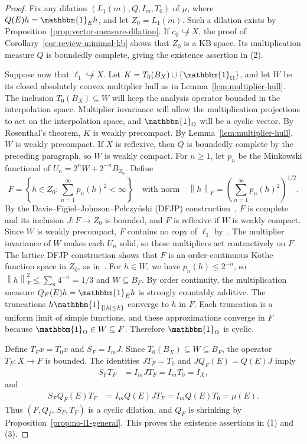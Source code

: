\documentclass[11pt,leqno]{amsart}
\theoremstyle{compact}
\numberwithin{equation}{section}
\theoremstyle{compactremark}
\theoremstyle{compact}
\newcommand{\1}{\mathbbm{1}}
\newcommand{\norm}[1]{\left\|#1\right\|}
\newcommand{\abs}[1]{\left|#1\right|}
\begin{document}
\begin{proof}
{Fix any dilation $(L_1(m),Q,I_m,T_0)$ of $\mu$, where $Q(E)h=\1_Eh$, and let $Z_0=L_1(m)$. Such a dilation exists by Proposition~\ref{prop:vector-measure-dilation}. If $c_0\not\hookrightarrow X$, the proof of Corollary~\ref{cor:review-minimal-kb} shows that $Z_0$ is a KB-space. Its multiplication measure $Q$ is boundedly complete, giving the existence assertion in (2).}

Suppose now that $\ell_1\not\hookrightarrow X$. Let $K=T_0(B_X)\cup\{\1_\Omega\}$, and let $W$ be its closed absolutely convex multiplier hull as in Lemma~\ref{lem:multiplier-hull}. The inclusion $T_0(B_X)\subseteq W$ will keep the analysis operator bounded in the interpolation space. Multiplier invariance will allow the multiplication projections to act on the interpolation space, and $\1_\Omega$ will be a cyclic vector. By Rosenthal's theorem, $K$ is weakly precompact. By Lemma~\ref{lem:multiplier-hull}, $W$ is weakly precompact. If $X$ is reflexive, then $Q$ is boundedly complete by the preceding paragraph, so $W$ is weakly compact. For $n\geq1$, let $p_n$ be the Minkowski functional of $U_n=2^nW+2^{-n}B_{Z_0}$. Define
\[
F=\left\{h\in Z_0:\sum_{n=1}^{\infty}p_n(h)^2<\infty\right\}
\quad\text{with norm}\quad \norm{h}_F=\left(\sum_{n=1}^{\infty}p_n(h)^2\right)^{1/2}.
\]
By the Davis--Figiel--Johnson--Pe\l czy\'nski (DFJP) construction~\cite[Lemma~1]{DFJP1974}, $F$ is complete and its inclusion $J\colon F\to Z_0$ is bounded, and $F$ is reflexive if $W$ is weakly compact. Since $W$ is weakly precompact, $F$ contains no copy of $\ell_1$ by~\cite[Section~4]{AvilesGuiraoLajaraRodriguezTradacete2016}. The multiplier invariance of $W$ makes each $U_n$ solid, so these multipliers act contractively on $F$. The lattice DFJP construction shows that $F$ is an order-continuous K\"othe function space in $Z_0$, as in~\cite[proof of Theorem~4.3 and Remark~4.4]{AvilesGuiraoLajaraRodriguezTradacete2016}. For $h\in W$, we have $p_n(h)\leq2^{-n}$, so $\norm{h}_F^2\leq\sum_n4^{-n}=1/3$ and $W\subseteq B_F$. By order continuity, the multiplication measure $Q_F(E)h=\1_Eh$ is strongly countably additive. The truncations $h\1_{\{\abs{h}\leq k\}}$ converge to $h$ in $F$. Each truncation is a uniform limit of simple functions, and these approximations converge in $F$ because $\1_\Omega\in W\subseteq F$. Therefore $\1_\Omega$ is cyclic.

Define $T_Fx=T_0x$ and $S_F=I_mJ$. Since $T_0(B_X)\subseteq W\subseteq B_F$, the operator $T_F\colon X\to F$ is bounded. The identities $JT_F=T_0$ and $JQ_F(E)=Q(E)J$ imply
\begin{align*}
S_FT_F&=I_mJT_F=I_mT_0=I_X,
\end{align*}
and
\begin{align*}
S_FQ_F(E)T_F&=I_mQ(E)JT_F=I_mQ(E)T_0=\mu(E).
\end{align*}
Thus $(F,Q_F,S_F,T_F)$ is a cyclic dilation, and $Q_F$ is shrinking by Proposition~\ref{prop:no-l1-general}. This proves the existence assertions in (1) and (3).


\end{proof}
\end{document}

